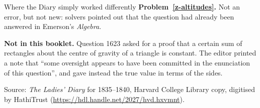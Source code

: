 \documentclass[11pt,a4paper]{article}
\begin{document}
\begin{diarynote}{Where the Diary simply worked differently}
\textbf{Problem~\ref{z-altitudes}.} Not an error, but not new: solvers pointed out that
the question had already been answered in Emerson's \textit{Algebra}.

\textbf{Not in this booklet.} Question 1623 asked for a proof that a certain sum of
rectangles about the centre of gravity of a triangle is constant. The editor printed a
note that ``some oversight appears to have been committed in the enunciation of this
question'', and gave instead the true value in terms of the sides.
\end{diarynote}

\vfill
{\small Source: \textit{The Ladies' Diary} for 1835--1840, Harvard College Library copy,
digitised by HathiTrust (\url{https://hdl.handle.net/2027/hvd.hxvmnt}).}
\end{document}
